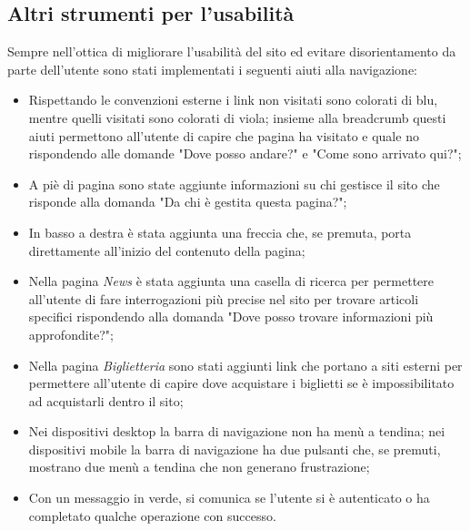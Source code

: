     \subsection{Altri strumenti per l'usabilità}
    Sempre nell'ottica di migliorare l'usabilità del sito ed evitare disorientamento da parte dell'utente sono stati implementati i seguenti aiuti alla navigazione:
    \begin{itemize}
        \item Rispettando le convenzioni esterne i link non visitati sono colorati di blu, mentre quelli visitati sono colorati di viola; insieme alla breadcrumb questi aiuti permettono all'utente di capire che pagina ha visitato e quale no rispondendo alle domande "Dove posso andare?" e "Come sono arrivato qui?";
        \item A piè di pagina sono state aggiunte informazioni su chi gestisce il sito che risponde alla domanda "Da chi è gestita questa pagina?";
        \item In basso a destra è stata aggiunta una freccia che, se premuta, porta direttamente all'inizio del contenuto della pagina;
        \item Nella pagina \textit{News} è stata aggiunta una casella di ricerca per permettere all'utente di fare interrogazioni più precise nel sito per trovare articoli specifici rispondendo alla domanda "Dove posso trovare informazioni più approfondite?";
        \item Nella pagina \textit{Biglietteria} sono stati aggiunti link che portano a siti esterni per permettere all'utente di capire dove acquistare i biglietti se è impossibilitato ad acquistarli dentro il sito;
        \item Nei dispositivi desktop la barra di navigazione non ha menù a tendina; nei dispositivi mobile la barra di navigazione ha due pulsanti che, se premuti, mostrano due menù a tendina che non generano frustrazione;
        \item Con un messaggio in verde, si comunica se l'utente si è autenticato o ha completato qualche operazione con successo.
    \end{itemize}

